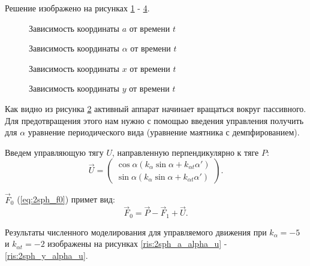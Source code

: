 Решение изображено на рисунках \ref{ris:2sph_a_no_u} - \ref{ris:2sph_y_no_u}.

\begin{figure}[H]
	\caption{Зависимость координаты $a$ от времени $t$}
	\label{ris:2sph_a_no_u}
\end{figure}
\begin{figure}[H]
	\caption{Зависимость координаты $\alpha$ от времени $t$}
	\label{ris:2sph_alpha_no_u}
\end{figure} 
\begin{figure}[H]
	\caption{Зависимость координаты $x$ от времени $t$}
	\label{ris:2sph_x_no_u}
\end{figure} 
\begin{figure}[H]
	\caption{Зависимость координаты $y$ от времени $t$}
	\label{ris:2sph_y_no_u}
\end{figure} 

Как видно из рисунка \ref{ris:2sph_alpha_no_u} активный аппарат начинает вращаться вокруг пассивного.
Для предотвращения этого нам нужно с помощью введения управления получить для $\alpha$ уравнение периодического вида (уравнение маятника с демпфированием).

Введем управляющую тягу $U$, направленную перпендикулярно к тяге $P$:
\begin{equation}
\label{ris:2sph_U_alpha}
	\vec{U} = 
	\begin{pmatrix}
		\cos \alpha \left(k_\alpha \sin \alpha + k_{\alpha t}\alpha'\right)\\
		\sin \alpha \left(k_\alpha \sin \alpha + k_{\alpha t}\alpha'\right)
	\end{pmatrix}.
\end{equation}

$\vec{F}_0$ (\ref{eq:2sph_f0}) примет вид:
\begin{equation}
\label{eq:2sph_f0_u}
	\vec{F}_0 = \vec{P} - \vec{F}_1 + \vec{U}.
\end{equation}

Результаты численного моделирования для управляемого движения при $k_\alpha = -5$ и $k_{\alpha t} = -2$ изображены на рисунках \ref{ris:2sph_a_alpha_u} - \ref{ris:2sph_y_alpha_u}.

